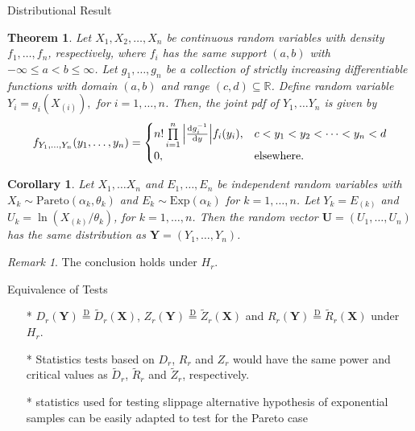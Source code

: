\documentclass{beamer}
\newcommand{\RR}{\mathbb{R}}
\newcommand{\prodi}[2][1]{\prod\limits_{i=#1}^{#2}}
\newcommand{\eqD}{\stackrel{\text{D}}{=}}
\newtheorem{thm}{Theorem}
\newtheorem{cor}{Corollary}
\theoremstyle{definition}
\theoremstyle{remark}
\newtheorem*{rem}{Remark}
\begin{document}

\begin{frame}{Distributional Result}
    
    \begin{thm}
        Let $X_1,X_2,\ldots, X_n$ be continuous random variables with density $f_1,\ldots, f_n$, respectively, where $f_i$ has the same support $(a,b)$ with $-\infty \leqslant a < b \leqslant \infty$. Let
        $g_1,\ldots,g_n$ be a collection of strictly increasing differentiable functions with domain $(a,b)$ and range $(c,d) \subseteq \RR$.
        Define random variable $Y_i = g_i(X_{(i)}),$ for $i =1,\ldots,n$.
    Then, the joint pdf of $Y_1,\ldots Y_n$ is given by
    {\small
    \[ 
        f_{Y_1,\ldots,Y_n}(y_1,\ldots, y_n) = \begin{cases}
            n!\prodi{n} \abs{ \dv{g_i^{-1}}{y}}  f_i(y_i), & c < y_1 < y_2 <\cdots < y_n < d
            \\
            0, & \text{elsewhere.}
        \end{cases}
        \]}
    \end{thm}
\end{frame}


\begin{frame}
    \begin{cor} \label{cor: distribution of log Pareto OS}
        Let $X_1, \ldots X_n$ and $E_1,\ldots, E_n$ be independent random variables with $ X_k \sim \mathrm{Pareto}(\alpha_k,\theta_k)$ and
        $E_k \sim \mathrm{Exp}(\alpha_k)$ for $k =1,\ldots,n$. Let $Y_k = E_{(k)}$ and $U_k = \ln(X_{(k)}/\theta_k)$, for $k =1,\ldots,n$.
        Then the random vector $\mathbf U =(U_1,\ldots, U_n)$ has the same distribution as $\mathbf Y = (Y_1,\ldots,Y_n)$.
    \end{cor}
    \begin{rem}
        The conclusion holds under $H_r$.
    \end{rem}
\end{frame}


\begin{frame}{Equivalence of Tests}
    \begin{itemize}
        \item[*] $D_r(\mathbf Y) \eqD \tilde D_r(\mathbf X)$, $Z_r(\mathbf Y) \eqD \tilde Z_r(\mathbf X)$ and $R_r(\mathbf Y) \eqD \tilde R_r(\mathbf X)$ under $H_r$.
        \item[*] Statistics tests based on $D_r$, $R_r$ and $Z_r$ would have the same power and critical values as $\tilde D_r$, $\tilde R_r$ and $\tilde Z_r$, respectively.
        \item[*] statistics used for testing slippage alternative hypothesis of exponential samples can be easily adapted to test for the Pareto case 
    \end{itemize}
\end{frame}
\end{document}
